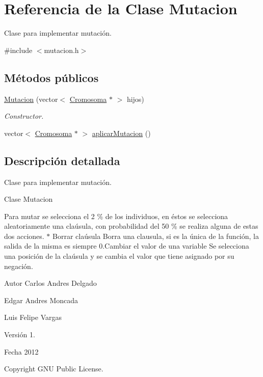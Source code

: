 \hypertarget{classMutacion}{\section{Referencia de la Clase Mutacion}
\label{classMutacion}
}


Clase para implementar mutación.  




{\ttfamily \#include $<$mutacion.\-h$>$}

\subsection*{Métodos públicos}
\begin{DoxyCompactItemize}
\item 
\hyperlink{classMutacion_a07d65c43c777e43d8b91ea8e9d992429}{Mutacion} (vector$<$ \hyperlink{classCromosoma}{Cromosoma} $\ast$ $>$ hijos)
\begin{DoxyCompactList}\small\item\em Constructor. \end{DoxyCompactList}\item 
vector$<$ \hyperlink{classCromosoma}{Cromosoma} $\ast$ $>$ \hyperlink{classMutacion_aad417b36379e665d5c9249f133020d93}{aplicar\-Mutacion} ()
\end{DoxyCompactItemize}


\subsection{Descripción detallada}
Clase para implementar mutación. 

\begin{DoxyVerb}Clase Mutacion
\end{DoxyVerb}


Para mutar se selecciona el 2 \% de los individuos, en éstos se selecciona aleatoriamente una claúsula, con probabilidad del 50 \% se realiza alguna de estas dos acciones. $\ast$ Borrar claúsula Borra una clausula, si es la única de la función, la salida de la misma es siempre 0.\-Cambiar el valor de una variable Se selecciona una posición de la claúsula y se cambia el valor que tiene asignado por su negación. \begin{DoxyAuthor}{Autor}
Carlos Andres Delgado 

Edgar Andres Moncada 

Luis Felipe Vargas 
\end{DoxyAuthor}
\begin{DoxyVersion}{Versión}
1. 
\end{DoxyVersion}
\begin{DoxyDate}{Fecha}
2012 
\end{DoxyDate}
\begin{DoxyCopyright}{Copyright}
G\-N\-U Public License. 
\end{DoxyCopyright}


